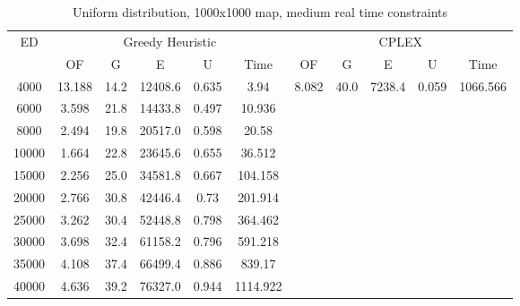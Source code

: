 \begin{table}[htb]
	\centering
	\begin{tabular}{|c|c|c|c|c|c|c|c|c|c|c|}
		\hline
		\multirow{2}{*}{ED} & \multicolumn{5}{c|}{Greedy Heuristic} & \multicolumn{5}{c|}{CPLEX}\\ 
		\cline{2-11}
& OF & G & E & U & Time & OF & G & E & U & Time\\ 
		\hline
		4000 & 13.188 & 14.2 & 12408.6 & 0.635 & 3.94 & 8.082 & 40.0 & 7238.4 & 0.059 & 1066.566 \\ 
		6000 & 3.598 & 21.8 & 14433.8 & 0.497 & 10.936 & & & & &  \\ 
		8000 & 2.494 & 19.8 & 20517.0 & 0.598 & 20.58 & & & & &  \\ 
		10000 & 1.664 & 22.8 & 23645.6 & 0.655 & 36.512 & & & & &  \\ 
		15000 & 2.256 & 25.0 & 34581.8 & 0.667 & 104.158 & & & & &  \\ 
		20000 & 2.766 & 30.8 & 42446.4 & 0.73 & 201.914 & & & & &  \\ 
		25000 & 3.262 & 30.4 & 52448.8 & 0.798 & 364.462 & & & & &  \\ 
		30000 & 3.698 & 32.4 & 61158.2 & 0.796 & 591.218 & & & & &  \\ 
		35000 & 4.108 & 37.4 & 66499.4 & 0.886 & 839.17 & & & & &  \\ 
		40000 & 4.636 & 39.2 & 76327.0 & 0.944 & 1114.922 & & & & &  \\ 
		\hline 
	\end{tabular} 
	\caption{Uniform distribution, 1000x1000 map, medium real time constraints} 
	\label{tab:unif_medium_n_esc_1000} 
\end{table} 

